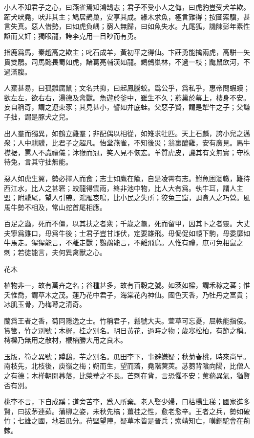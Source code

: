 \documentclass[12pt,a4paper]{ctexbook}
\begin{document}
小人不知君子之心，曰燕雀焉知鴻鵠志；君子不受小人之侮，曰虎豹豈受犬羊欺。跖犬吠堯，吠非其主；鳩居鵲巢，安享其成。緣木求魚，極言難得；按圖索驥，甚言失真。惡人借勢，曰如虎負嵎；窮人無歸，曰如魚失水。九尾狐，譏陳彭年素性諂而又奸；獨眼龍，誇李克用一目眇而有勇。\par
指鹿爲馬，秦趙高之欺主；叱石成羊，黃初平之得仙。卞莊勇能擒兩虎，高駢一矢貫雙鵰。司馬懿畏蜀如虎，諸葛亮輔漢如龍。鷦鷯巢林，不過一枝；鼴鼠飲河，不過滿腹。\par
人棄甚易，曰孤雛腐鼠；文名共抑，曰起鳳騰蛟。爲公乎，爲私乎，惠帝問蝦蟆；欲左左，欲右右，湯德及禽獸。魚遊於釜中，雖生不久；燕巢於幕上，棲身不安。妄自稱奇，謂之遼東豕；其見甚小，譬如井底蛙。父惡子賢，謂是犁牛之子；父謙子拙，謂是豚犬之兒。\par
出人羣而獨異，如鶴立雞羣；非配偶以相從，如雉求牡匹。天上石麟，誇小兒之邁衆；人中騏驥，比君子之超凡。怡堂燕雀，不知後災；翁裏醯雞，安有廣見。馬牛襟裾，罵人不識禮儀；沐猴而冠，笑人見不恢宏。羊質虎皮，譏其有文無實；守株待兔，言其守拙無能。\par
惡人如虎生翼，勢必擇人而食；志士如鷹在籠，自是凌霄有志。鮒魚困涸轍，難待西江水，比人之甚窘；蛟龍得雲雨，終非池中物，比人大有爲。執牛耳，謂人主盟；附驥尾，望人引帶。鴻雁哀鳴，比小民之失所；狡兔三窟，誚貪人之巧營。風馬牛勢不相及，常山蛇首尾相應。\par
百足之蟲，死而不僵，以其扶之者衆；千歲之龜，死而留甲，因其卜之者靈。大丈夫寧爲雞口，毋爲牛後；士君子豈甘雌伏，定要雄飛。毋侷促如轅下駒，毋委靡如牛馬走。猩猩能言，不離走獸；鸚鵡能言，不離飛鳥。人惟有禮，庶可免相鼠之刺；若徒能言，夫何異禽獸之心。\par
花木\par
植物非一，故有萬卉之名；谷種甚多，故有百穀之號。如茨如樑，謂禾稼之蕃；惟夭惟喬，謂草木之茂。蓮乃花中君子，海棠花內神仙。國色天香，乃牡丹之富貴；冰肌玉骨，乃梅萼之清奇。\par
蘭爲王者之香，菊同隱逸之士。竹稱君子，鬆號大夫。萱草可忘憂，屈軼能指佞。篔簹，竹之別號；木樨，桂之別名。明日黃花，過時之物；歲寒松柏，有節之稱。樗櫟乃無用之散材，楩楠勝大用之良木。\par
玉版，筍之異號；蹲鴟，芋之別名。瓜田李下，事避嫌疑；秋菊春桃，時來尚早。南枝先，北枝後，庾嶺之梅；朔而生，望而落，堯階蓂莢。苾蒭背陰向陽，比僧人之有德；木槿朝開暮落，比榮華之不長。芒刺在背，言恐懼不安；薰蕕異氣，猶賢否有別。\par
桃李不言，下自成蹊；道旁苦李，爲人所棄。老人娶少婦，曰枯楊生稊；國家進多賢，曰拔茅連茹。蒲柳之姿，未秋先槁；薑桂之性，愈老愈辛。王者之兵，勢如破竹；七雄之國，地若瓜分。苻堅望陣，疑草木皆是晉兵；索靖知亡，嘆銅駝會在荊棘。\par
\end{document}

